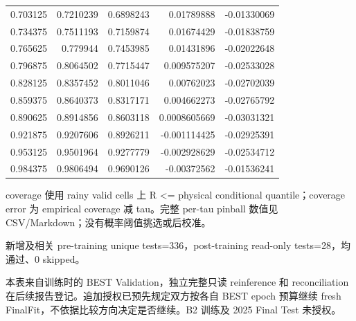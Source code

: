 \documentclass[UTF8,11pt,fontset=windows]{ctexart}
\begin{document}
\begin{longtable}{rrrrr}
0.703125 & 0.7210239 & 0.6898243 & 0.01789888 & -0.01330069 \\
0.734375 & 0.7511193 & 0.7159874 & 0.01674429 & -0.01838759 \\
0.765625 & 0.779944 & 0.7453985 & 0.01431896 & -0.02022648 \\
0.796875 & 0.8064502 & 0.7715447 & 0.009575207 & -0.02533028 \\
0.828125 & 0.8357452 & 0.8011046 & 0.00762023 & -0.02702039 \\
0.859375 & 0.8640373 & 0.8317171 & 0.004662273 & -0.02765792 \\
0.890625 & 0.8914856 & 0.8603118 & 0.0008605669 & -0.03031321 \\
0.921875 & 0.9207606 & 0.8926211 & -0.001114425 & -0.02925391 \\
0.953125 & 0.9501964 & 0.9277779 & -0.002928629 & -0.02534712 \\
0.984375 & 0.9806494 & 0.9690126 & -0.00372562 & -0.01536241 \\
\bottomrule\end{longtable}\normalsize
coverage 使用 rainy valid cells 上 R <= physical conditional quantile；coverage error 为 empirical coverage 减 tau。完整 per-tau pinball 数值见 CSV/Markdown；没有概率阈值挑选或后校准。

新增及相关 pre-training unique tests=336，post-training read-only tests=28，均通过、0 skipped。

本表来自训练时的 BEST Validation，独立完整只读 reinference 和 reconciliation 在后续报告登记。追加授权已预先规定双方按各自 BEST epoch 预算继续 fresh FinalFit，不依据比较方向决定是否继续。B2 训练及 2025 Final Test 未授权。
\end{document}
